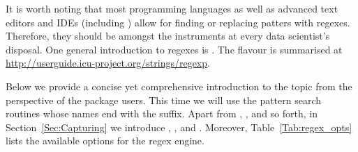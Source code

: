 \documentclass[nojss]{jss}
\begin{document}
It is worth noting that most programming languages
as well as advanced text editors and IDEs (including )
allow for finding or replacing patters with regexes.
Therefore, they should be amongst the instruments
at every data scientist's disposal.
One general introduction to regexes is \citep{friedl}.
The  flavour is summarised at
\url{http://userguide.icu-project.org/strings/regexp}.






Below we provide a concise yet comprehensive introduction
to the topic from the perspective of the  package users.
This time we will use the pattern search routines whose names
end with the  suffix.
Apart from , ,
and so forth, in Section~\ref{Sec:Capturing} we introduce
,
, and
.
Moreover, Table~\ref{Tab:regex_opts} lists the available options
for the regex engine.


\end{document}
